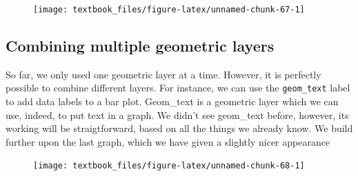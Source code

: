 \documentclass[]{tufte-book}
\newenvironment{Shaded}{}{}
\newcommand{\DataTypeTok}[1]{\textcolor[rgb]{0.56,0.13,0.00}{#1}}
\newcommand{\DecValTok}[1]{\textcolor[rgb]{0.25,0.63,0.44}{#1}}
\newcommand{\KeywordTok}[1]{\textcolor[rgb]{0.00,0.44,0.13}{\textbf{#1}}}
\newcommand{\NormalTok}[1]{#1}
\newcommand{\OperatorTok}[1]{\textcolor[rgb]{0.40,0.40,0.40}{#1}}
\newcommand{\StringTok}[1]{\textcolor[rgb]{0.25,0.44,0.63}{#1}}
\begin{document}
\begin{figure}
\texttt{[image: textbook\_files/figure-latex/unnamed-chunk-67-1]} \end{figure}

\hypertarget{combining-multiple-geometric-layers}{%
\subsection{Combining multiple geometric layers}\label{combining-multiple-geometric-layers}}

So far, we only used one geometric layer at a time. However, it is perfectly possible to combine different layers. For instance, we can use the \texttt{geom\_text} label to add data labels to a bar plot. Geom\_text is a geometric layer which we can use, indeed, to put text in a graph. We didn't see geom\_text before, however, its working will be straigtforward, based on all the things we already know. We build further upon the last graph, which we have given a slightly nicer appearance

\begin{Shaded}
\end{Shaded}

\begin{figure}
\texttt{[image: textbook\_files/figure-latex/unnamed-chunk-68-1]} \end{figure}
\end{document}
